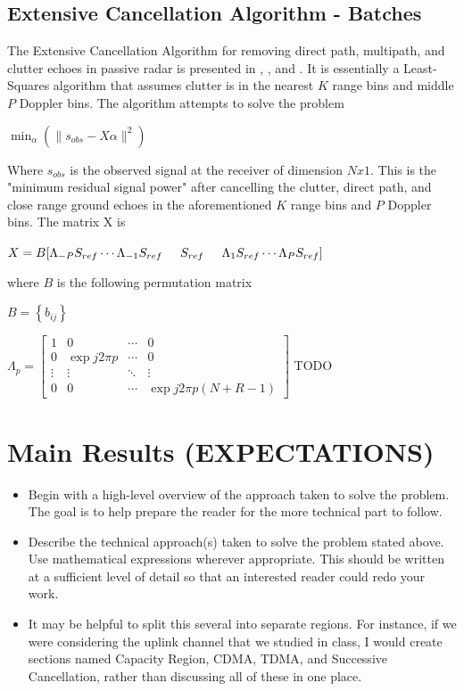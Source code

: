 \documentclass[article,11pt,onecolumn,final]{IEEEtran}
\begin{document}
\subsection{Extensive Cancellation Algorithm - Batches}

The Extensive Cancellation Algorithm for removing direct path, multipath, and clutter echoes in passive radar is presented in \cite{Colone2006}, \cite{Colone2009}, and \cite{Colone2012}. It is essentially a Least-Squares algorithm that assumes clutter is in the nearest $K$ range bins and middle $P$ Doppler bins. The algorithm attempts to solve the problem

$ \min_{\alpha}(\|s_{obs} - X\alpha\|^2) $

Where $s_{obs}$ is the observed signal at the receiver of dimension $N x 1$. This is the "minimum residual signal power" after cancelling the clutter, direct path, and close range ground echoes in the aforementioned $K$ range bins and $P$ Doppler bins. The matrix X is

$X = B[\Lambda_{-P}S_{ref} \cdots \Lambda_{-1}S_{ref} \hspace{5 mm} S_{ref} \hspace{5mm} \Lambda_{1}S_{ref} \cdots \Lambda_{P}S_{ref}]$

where $B$ is the following permutation matrix

$B = \left \{b_{ij} \right \} $

$\Lambda_p = 
	\begin{bmatrix}
	 1			&		0				&		\cdots		&		0 \\
	 0			&		\exp{j2\pi p}	&		\cdots		&		0 \\
	 \vdots 	&		\vdots			&		\ddots		&		\vdots \\
	 0			&		0				&		\cdots		&		\exp{j2\pi p(N + R - 1)}
	\end{bmatrix}
$
TODO

\section{Main Results (EXPECTATIONS)}
\begin{itemize}

\item Begin with a high-level overview of the approach taken to solve the problem. The goal is to help prepare the reader for the more technical part to follow.

\item Describe the technical approach(s) taken to solve the problem stated above. Use mathematical expressions wherever appropriate. This should be written at a sufficient level of detail so that an interested reader could redo your work.

\item It may be helpful to split this several into separate regions. For instance, if we were considering the uplink channel that we studied in class, I would create sections named Capacity Region, CDMA, TDMA, and Successive Cancellation, rather than discussing all of these in one place. 

\end{itemize} 
\end{document}
